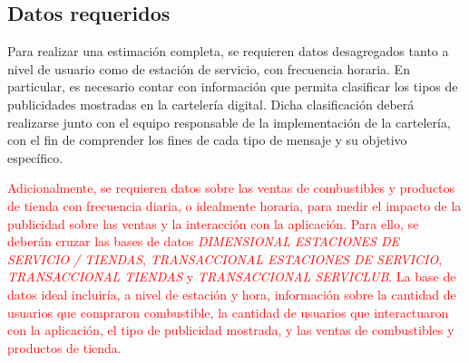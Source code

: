 



\subsection{Datos requeridos}

Para realizar una estimación completa, se requieren datos desagregados tanto a nivel de usuario como de estación de servicio, con frecuencia horaria. En particular, es necesario contar con información que permita clasificar los tipos de publicidades mostradas en la cartelería digital. Dicha clasificación deberá realizarse junto con el equipo responsable de la implementación de la cartelería, con el fin de comprender los fines de cada tipo de mensaje y su objetivo específico.

\textcolor{red}{Adicionalmente, se requieren datos sobre las ventas de combustibles y productos de tienda con frecuencia diaria, o idealmente horaria, para medir el impacto de la publicidad sobre las ventas y la interacción con la aplicación. Para ello, se deberán cruzar las bases de datos \emph{DIMENSIONAL ESTACIONES DE SERVICIO / TIENDAS}, \emph{TRANSACCIONAL ESTACIONES DE SERVICIO}, \emph{TRANSACCIONAL TIENDAS} y \emph{TRANSACCIONAL SERVICLUB}. La base de datos ideal incluiría, a nivel de estación y hora, información sobre la cantidad de usuarios que compraron combustible, la cantidad de usuarios que interactuaron con la aplicación, el tipo de publicidad mostrada, y las ventas de combustibles y productos de tienda.}

